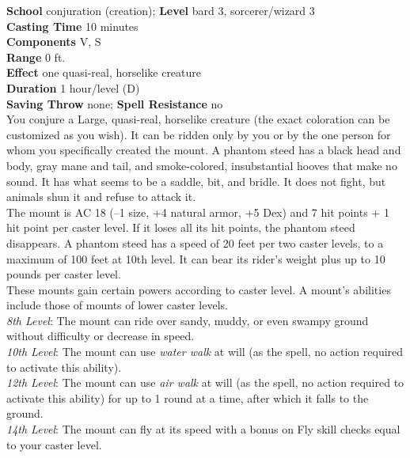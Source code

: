 \textbf{School} conjuration (creation); \textbf{Level} bard 3, sorcerer/wizard 3\\
\textbf{Casting Time} 10 minutes\\
\textbf{Components} V, S\\
\textbf{Range} 0 ft.\\
\textbf{Effect} one quasi-real, horselike creature\\
\textbf{Duration} 1 hour/level (D)\\
\textbf{Saving Throw} none; \textbf{Spell Resistance} no\\
You conjure a Large, quasi-real, horselike creature (the exact coloration can be customized as you wish). It can be ridden only by you or by the one person for whom you specifically created the mount. A phantom steed has a black head and body, gray mane and tail, and smoke-colored, insubstantial hooves that make no sound. It has what seems to be a saddle, bit, and bridle. It does not fight, but animals shun it and refuse to attack it.\\
The mount is AC 18 (–1 size, +4 natural armor, +5 Dex) and 7 hit points + 1 hit point per caster level. If it loses all its hit points, the phantom steed disappears. A phantom steed has a speed of 20 feet per two caster levels, to a maximum of 100 feet at 10th level. It can bear its rider's weight plus up to 10 pounds per caster level.\\
These mounts gain certain powers according to caster level. A mount's abilities include those of mounts of lower caster levels. \\
\textit{8th Level}: The mount can ride over sandy, muddy, or even swampy ground without difficulty or decrease in speed.\\
\textit{10th Level}: The mount can use \textit{water walk }at will (as the spell, no action required to activate this ability).\\
\textit{12th Level}: The mount can use \textit{air walk }at will (as the spell, no action required to activate this ability) for up to 1 round at a time, after which it falls to the ground.\\
\textit{14th Level}: The mount can fly at its speed with a bonus on Fly skill checks equal to your caster level.\\
